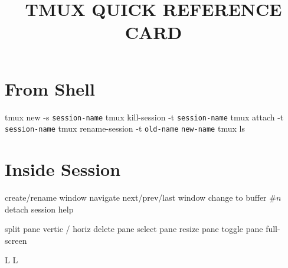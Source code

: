 
\def\cmdOptLl#1#2{
    \hsize=8.5cm
    \vbox {
        \hbox{
      \hskip 15pt
      \noindent\cmd{\tt--#1}
      \hfil
        }%
        \hskip 70pt  %
        \hbox to 5.9cm {%
            \hfuzz = 5pt
            \hfil
            \hsize=5.9cm
            \vtop{
                {#2}
            }}
    }%
    \par
    \vskip 0.14cm
}


\title{TMUX QUICK REFERENCE CARD}

\shortintro

\section{From Shell}

	{tmux new -s {\tt session-name}}
	{tmux kill-session -t {\tt session-name}}
	{tmux attach -t {\tt session-name}}
	{tmux rename-session -t {\tt old-name} {\tt new-name}}
	{tmux ls}

\section{Inside Session}

	{create/rename window}
	{navigate next/prev/last window}
	{change to buffer \#$n$}
	{detach session}
	{help}

	{split pane vertic / horiz}
	{delete pane}
	{select pane}
	{resize pane}
	{toggle pane full-screen}

\copyrightnotice

\supereject
\if L\lr \else\null\vfill\eject\fi
\if L\lr \else\null\vfill\eject\fi
\bye

